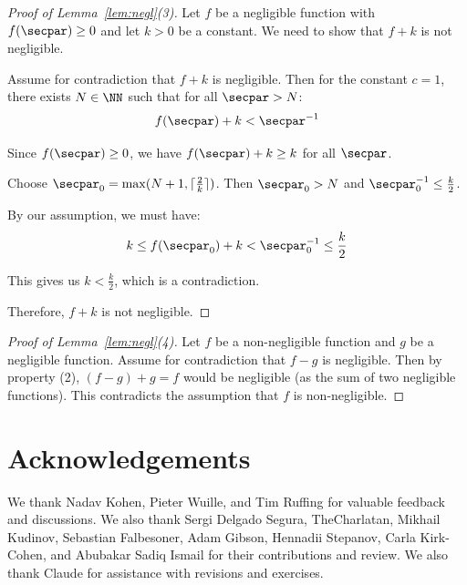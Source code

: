\documentclass[
  a4paper,
  orivec,oribibl]{llncs}
\begin{document}
\begin{proof}[Proof of Lemma~\ref{lem:negl}(3)]
  Let $f$ be a negligible function with $f(\secpar) \ge 0$ and let $k > 0$ be a constant.
  We need to show that $f + k$ is not negligible.
  
  Assume for contradiction that $f + k$ is negligible. 
  Then for the constant $c = 1$, there exists $N \in \NN$ such that for all $\secpar > N$:
  \[
    f(\secpar) + k < \secpar^{-1}
  \]
  
  Since $f(\secpar) \ge 0$, we have $f(\secpar) + k \ge k$ for all $\secpar$.
  
  Choose $\secpar_0 = \max(N + 1, \lceil \frac{2}{k} \rceil)$. Then $\secpar_0 > N$ and $\secpar_0^{-1} \le \frac{k}{2}$.
  
  By our assumption, we must have:
  \[
    k \le f(\secpar_0) + k < \secpar_0^{-1} \le \frac{k}{2}
  \]
  
  This gives us $k < \frac{k}{2}$, which is a contradiction.
  
  Therefore, $f + k$ is not negligible.
\end{proof}

\begin{proof}[Proof of Lemma~\ref{lem:negl}(4)]
  Let $f$ be a non-negligible function and $g$ be a negligible function.
  Assume for contradiction that $f - g$ is negligible.
  Then by property (2), $(f - g) + g = f$ would be negligible (as the sum of two negligible functions).
  This contradicts the assumption that $f$ is non-negligible.
\end{proof}



\newpage
\section*{Acknowledgements}
We thank Nadav Kohen, Pieter Wuille, and Tim Ruffing for valuable feedback and discussions.
We also thank Sergi Delgado Segura, TheCharlatan, Mikhail Kudinov, Sebastian Falbesoner, Adam Gibson, Hennadii Stepanov, Carla Kirk-Cohen, and Abubakar Sadiq Ismail for their contributions and review.
We also thank Claude for assistance with revisions and exercises.

\iffull
\end{document}
